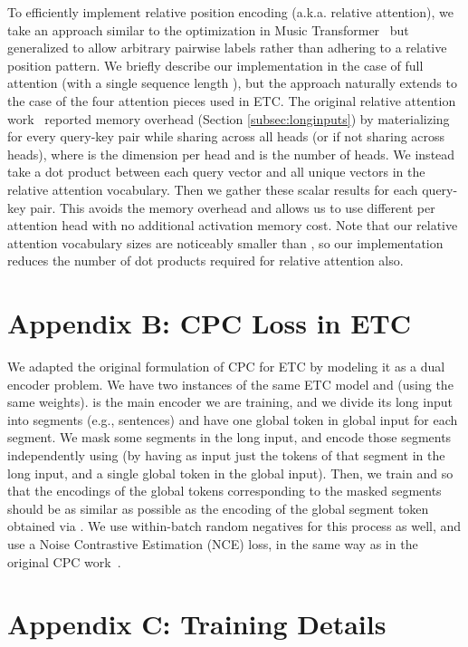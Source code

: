 \documentclass[11pt,a4paper]{article}
\begin{document}
To efficiently implement relative position encoding (a.k.a. relative attention), we take an approach similar to the optimization in Music Transformer~\cite{huang2018music} but generalized to allow arbitrary pairwise labels rather than adhering to a relative position pattern.  We briefly describe our implementation in the case of full attention (with a single sequence length ), but the approach naturally extends to the case of the four attention pieces used in ETC.  The original relative attention work~\cite{shaw2018self} reported  memory overhead (Section \ref{subsec:longinputs}) by materializing  for every query-key pair while sharing  across all heads (or  if not sharing across heads), where  is the dimension per head and  is the number of heads.  We instead take a dot product between each query vector and all unique  vectors in the relative attention vocabulary.  Then we gather these scalar results for each query-key pair.  This avoids the  memory overhead and allows us to use different  per attention head with no additional activation memory cost. Note that our relative attention vocabulary sizes are noticeably smaller than , so our implementation reduces the number of dot products required for relative attention also.

\section*{Appendix B: CPC Loss in ETC}\label{app:cpc}

We adapted the original formulation of CPC for ETC by modeling it as a dual encoder problem. We have two instances of the same ETC model  and  (using the same weights).  is the main encoder we are training, and we divide its long input into segments (e.g., sentences) and have one global token in global input for each segment. We mask some segments in the long input, and encode those segments independently using  (by having as input just the tokens of that segment in the long input, and a single global token in the global input). Then, we train  and  so that the encodings of the global tokens corresponding to the masked segments should be as similar as possible as the encoding of the global segment token obtained via . We use within-batch random negatives for this process as well, and use a Noise Contrastive Estimation (NCE) loss, in the same way as in the original CPC work~\cite{oord2018representation}.

\section*{Appendix C: Training Details}\label{app:training}
\end{document}
